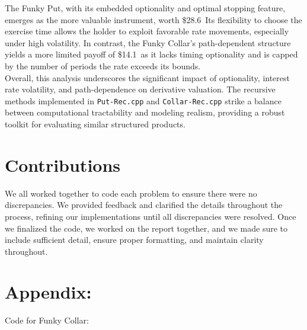 \documentclass{report}
\begin{document}
The Funky Put, with its embedded optionality and optimal stopping feature, emerges as the more valuable instrument, worth \$28.6\, Its flexibility to choose the exercise time allows the holder to exploit favorable rate movements, especially under high volatility. In contrast, the Funky Collar’s path-dependent structure yields a more limited payoff of \$14.1\, as it lacks timing optionality and is capped by the number of periods the rate exceeds its bounds. \\

Overall, this analysis underscores the significant impact of optionality, interest rate volatility, and path-dependence on derivative valuation. The recursive methods implemented in \texttt{Put-Rec.cpp} and \texttt{Collar-Rec.cpp} strike a balance between computational tractability and modeling realism, providing a robust toolkit for evaluating similar structured products. \\


\section*{Contributions}
We all worked together to code each problem to ensure there were no discrepancies. We provided feedback and clarified the details throughout the process, refining our implementations until all discrepancies were resolved. Once we finalized the code, we worked on the report together, and we made sure to include sufficient detail, ensure proper formatting, and maintain clarity throughout.

\newpage
\section*{Appendix:}

Code for Funky Collar:
\end{document}
